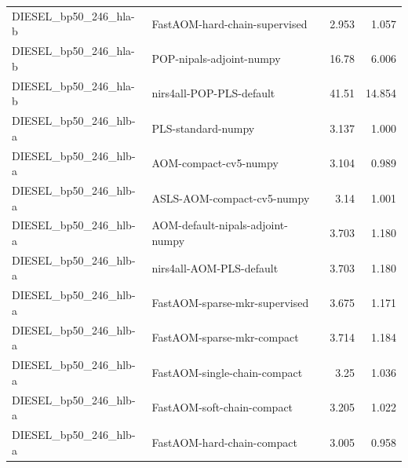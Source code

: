 \begin{landscape}
\begin{longtable}{L{8.0cm}L{9.5cm}rr}
DIESEL\_\allowbreak{}bp50\_\allowbreak{}246\_\allowbreak{}hla-\allowbreak{}b & FastAOM-\allowbreak{}hard-\allowbreak{}chain-\allowbreak{}supervised & 2.953 & 1.057 \\
DIESEL\_\allowbreak{}bp50\_\allowbreak{}246\_\allowbreak{}hla-\allowbreak{}b & POP-\allowbreak{}nipals-\allowbreak{}adjoint-\allowbreak{}numpy & 16.78 & 6.006 \\
DIESEL\_\allowbreak{}bp50\_\allowbreak{}246\_\allowbreak{}hla-\allowbreak{}b & nirs4all-\allowbreak{}POP-\allowbreak{}PLS-\allowbreak{}default & 41.51 & 14.854 \\
DIESEL\_\allowbreak{}bp50\_\allowbreak{}246\_\allowbreak{}hlb-\allowbreak{}a & PLS-\allowbreak{}standard-\allowbreak{}numpy & 3.137 & 1.000 \\
DIESEL\_\allowbreak{}bp50\_\allowbreak{}246\_\allowbreak{}hlb-\allowbreak{}a & AOM-\allowbreak{}compact-\allowbreak{}cv5-\allowbreak{}numpy & 3.104 & 0.989 \\
DIESEL\_\allowbreak{}bp50\_\allowbreak{}246\_\allowbreak{}hlb-\allowbreak{}a & ASLS-\allowbreak{}AOM-\allowbreak{}compact-\allowbreak{}cv5-\allowbreak{}numpy & 3.14 & 1.001 \\
DIESEL\_\allowbreak{}bp50\_\allowbreak{}246\_\allowbreak{}hlb-\allowbreak{}a & AOM-\allowbreak{}default-\allowbreak{}nipals-\allowbreak{}adjoint-\allowbreak{}numpy & 3.703 & 1.180 \\
DIESEL\_\allowbreak{}bp50\_\allowbreak{}246\_\allowbreak{}hlb-\allowbreak{}a & nirs4all-\allowbreak{}AOM-\allowbreak{}PLS-\allowbreak{}default & 3.703 & 1.180 \\
DIESEL\_\allowbreak{}bp50\_\allowbreak{}246\_\allowbreak{}hlb-\allowbreak{}a & FastAOM-\allowbreak{}sparse-\allowbreak{}mkr-\allowbreak{}supervised & 3.675 & 1.171 \\
DIESEL\_\allowbreak{}bp50\_\allowbreak{}246\_\allowbreak{}hlb-\allowbreak{}a & FastAOM-\allowbreak{}sparse-\allowbreak{}mkr-\allowbreak{}compact & 3.714 & 1.184 \\
DIESEL\_\allowbreak{}bp50\_\allowbreak{}246\_\allowbreak{}hlb-\allowbreak{}a & FastAOM-\allowbreak{}single-\allowbreak{}chain-\allowbreak{}compact & 3.25 & 1.036 \\
DIESEL\_\allowbreak{}bp50\_\allowbreak{}246\_\allowbreak{}hlb-\allowbreak{}a & FastAOM-\allowbreak{}soft-\allowbreak{}chain-\allowbreak{}compact & 3.205 & 1.022 \\
DIESEL\_\allowbreak{}bp50\_\allowbreak{}246\_\allowbreak{}hlb-\allowbreak{}a & FastAOM-\allowbreak{}hard-\allowbreak{}chain-\allowbreak{}compact & 3.005 & 0.958 \\

\end{longtable}
\end{landscape}
